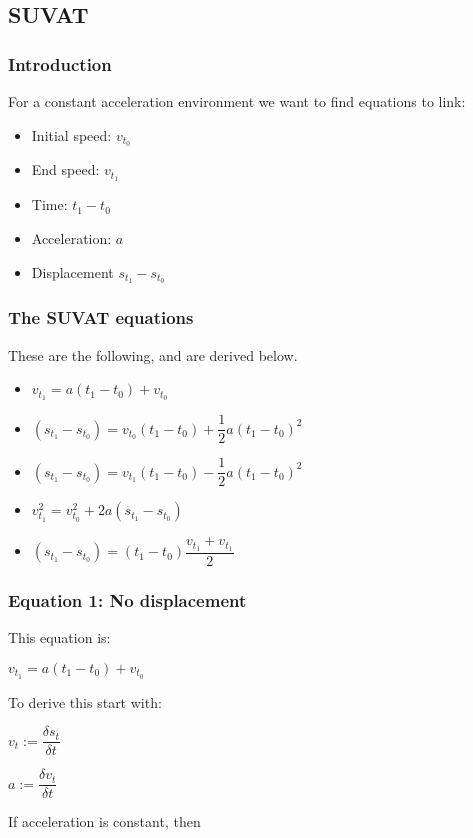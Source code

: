 
\subsection{SUVAT}

\subsubsection{Introduction}

For a constant acceleration environment we want to find equations to link:
\begin{itemize}
\item Initial speed: \(v_{t_0}\)
\item End speed: \(v_{t_1}\)
\item Time: \(t_1-t_0\)
\item Acceleration: \(a\)
\item Displacement \(s_{t_1}-s_{t_0}\)
\end{itemize}

\subsubsection{The SUVAT equations}

These are the following, and are derived below.

\begin{itemize}
\item \(v_{t_1}=a(t_1-t_0)+v_{t_0}\)
\item \((s_{t_1}-s_{t_0})=v_{t_0}(t_1-t_0)+\dfrac{1}{2}a(t_1-t_0)^2\)
\item \((s_{t_1}-s_{t_0})=v_{t_1}(t_1-t_0)-\dfrac{1}{2}a(t_1-t_0)^2\)
\item \(v_{t_1}^2= v_{t_0}^2+2a(s_{t_1}-s_{t_0})\)
\item \((s_{t_1}-s_{t_0})=(t_1-t_0)\dfrac{v_{t_1}+v_{t_1}}{2}\)
\end{itemize}

\subsubsection{Equation 1: No displacement}

This equation is:

\(v_{t_1}=a(t_1-t_0)+v_{t_0}\)

To derive this start with:

\(v_t:=\dfrac{\delta s_t}{\delta t}\)

\(a:=\dfrac{\delta v_t}{\delta t}\)

If acceleration is constant, then 

